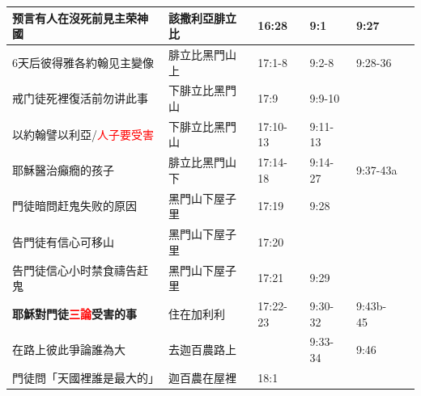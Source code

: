 \begin{table}[H]
\begin{tabular}{p{13.07em}|l|l|l|p{5.285em}|r}
预言有人在沒死前見主荣神國& \multicolumn{1}{p{7.93em}|}{該撒利亞腓立比} & \multicolumn{1}{p{5.285em}|}{16:28} & \multicolumn{1}{p{5.57em}|}{9:1} & 9:27 &  \\ \midrule


6天后彼得雅各約翰见主變像& \multicolumn{1}{p{7.93em}|}{腓立比黑門山上} & \multicolumn{1}{p{5.285em}|}{17:1-8} & \multicolumn{1}{p{5.57em}|}{9:2-8} & 9:28-36 &  \\ \midrule
 
戒门徒死裡復活前勿讲此事& \multicolumn{1}{p{7.93em}|}{下腓立比黑門山} & \multicolumn{1}{p{5.285em}|}{17:9} & \multicolumn{1}{p{5.57em}|}{9:9-10} &  &  \\ \midrule
  
以約翰譬以利亞/\textcolor{red}{人子要受害}& \multicolumn{1}{p{7.93em}|}{下腓立比黑門山} & \multicolumn{1}{p{5.285em}|}{17:10-13} & \multicolumn{1}{p{5.57em}|}{9:11-13} &  &  \\ \midrule


耶穌醫治癲癇的孩子 & \multicolumn{1}{p{7.93em}|}{腓立比黑門山下} & \multicolumn{1}{p{5.285em}|}{17:14-18} & \multicolumn{1}{p{5.57em}|}{9:14-27} & 9:37-43a &  \\\midrule

門徒暗問赶鬼失败的原因& \multicolumn{1}{p{7.93em}|}{黑門山下屋子里} & \multicolumn{1}{p{5.285em}|}{17:19} & \multicolumn{1}{p{5.57em}|}{9:28} & &  \\\midrule
告門徒有信心可移山& \multicolumn{1}{p{7.93em}|}{黑門山下屋子里} & \multicolumn{1}{p{5.285em}|}{17:20} & \multicolumn{1}{p{5.57em}|}{} & &  \\\midrule
告門徒信心小时禁食禱告赶鬼& \multicolumn{1}{p{7.93em}|}{黑門山下屋子里} & \multicolumn{1}{p{5.285em}|}{17:21} & \multicolumn{1}{p{5.57em}|}{9:29} & &  \\\midrule

\textbf{耶穌對門徒\textcolor{red}{三論}受害的事} & \multicolumn{1}{p{7.93em}|}{住在加利利} & \multicolumn{1}{p{5.285em}|}{17:22-23} & \multicolumn{1}{p{5.57em}|}{9:30-32} & 9:43b-45 &  \\ \midrule

在路上彼此爭論誰為大& \multicolumn{1}{p{7.93em}|}{去迦百農路上} & \multicolumn{1}{p{5.285em}|}{} & \multicolumn{1}{p{5.57em}|}{9:33-34} & 9:46&  \\ \midrule

門徒問「天國裡誰是最大的」& \multicolumn{1}{p{7.93em}|}{迦百農在屋裡} & \multicolumn{1}{p{5.285em}|}{18:1} & \multicolumn{1}{p{5.57em}|}{} & &  \\ \midrule


\end{tabular}
\end{table}
